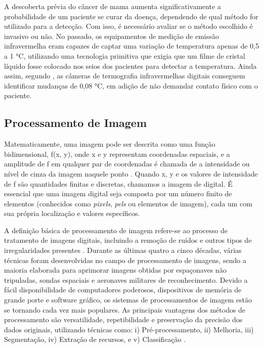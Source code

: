 A descoberta prévia do câncer de mama aumenta significativamente a probabilidade de um paciente se curar da doença, dependendo de qual método for utilizado para a detecção. Com isso, é necessário avaliar se o método escolhido é invasivo ou não. No passado, os equipamentos de medição de emissão infravermelha eram capazes de captar uma variação de temperatura apenas de 0,5 a 1 °C, utilizando uma tecnologia primitiva que exigia que um filme de cristal líquido fosse colocado nos seios dos pacientes para detectar a temperatura. Ainda assim, segundo , as câmeras de termografia infravermelhas digitais conseguem identificar mudanças de 0,08 °C, em adição de não demandar contato físico com o paciente.



\subsection{\esp Processamento de Imagem} \label{procesamentoimg}

Matematicamente, uma imagem pode ser descrita como uma função bidimensional, f(x, y), onde x e y representam coordenadas espaciais, e a amplitude de f em qualquer par de coordenadas é chamada de a intensidade ou nível de cinza da imagem naquele ponto \cite{techniques}. Quando x, y e os valores de intensidade de f são quantidades finitas e discretas, chamamos a imagem de digital. É essencial que uma imagem digital seja composta por um número finito de elementos (conhecidos como \textit{pixels}, \textit{pels} ou elementos de imagem), cada um com sua própria localização e valores específicos. 

A definição básica de processamento de imagem refere-se ao processo de tratamento de imagens digitais, incluindo a remoção de ruídos e outros tipos de irregularidades presentes \cite{histopathological}. Durante as últimas quatro a cinco décadas, várias técnicas foram desenvolvidas no campo de processamento de imagens, sendo a maioria elaborada para aprimorar imagens obtidas por espaçonaves não tripuladas, sondas espaciais e aeronaves militares de reconhecimento. Devido a fácil disponibilidade de computadores poderosos, dispositivos de memória de grande porte e software gráfico, os sistemas de processamentos de imagem estão se tornando cada vez mais populares. As principais vantagens dos métodos de processamento são versatilidade, repetibilidade e preservação da precisão dos dados originais, utilizando técnicas como: i) Pré-processamento, ii) Melhoria, iii) Segmentação, iv) Extração de recursos, e v) Classificação \cite{lungcancer}.

